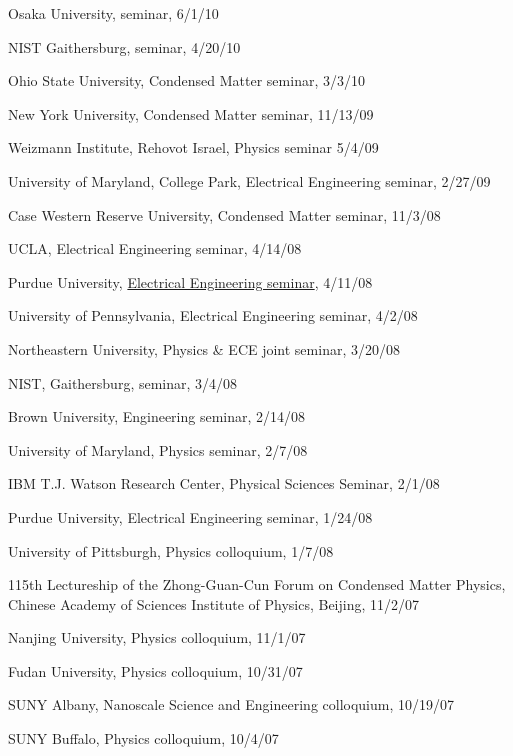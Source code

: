 \documentclass[paper=letter,fontsize=11pt]{scrartcl} %
\newcommand{\TalkEntry}[4]{
		\noindent #1, #2, #3 #4}
\begin{document}
\begin{etaremune}
\item\TalkEntry{Osaka University}{seminar}{6/1/10}{}
\item\TalkEntry{NIST Gaithersburg}{seminar}{4/20/10}{}
\item\TalkEntry{Ohio State University}{Condensed Matter seminar}{3/3/10}{}
\item\TalkEntry{New York University}{Condensed Matter seminar}{11/13/09}{}
\item\TalkEntry{Weizmann Institute}{Rehovot Israel}{Physics seminar}{5/4/09}{}
\item\TalkEntry{University of Maryland, College Park}{Electrical Engineering seminar}{2/27/09}{}
\item\TalkEntry{Case Western Reserve University}{Condensed Matter seminar}{11/3/08}{}
\item\TalkEntry{UCLA}{Electrical Engineering seminar}{4/14/08}{}
\item\TalkEntry{Purdue University}{\href{https://nanohub.org/resources/4492}{Electrical Engineering seminar}}{4/11/08 }{}
\item\TalkEntry{University of Pennsylvania}{Electrical Engineering seminar}{4/2/08 }{}
\item\TalkEntry{Northeastern University}{Physics \& ECE joint seminar}{3/20/08}{}
\item\TalkEntry{NIST, Gaithersburg}{seminar}{3/4/08}{}
\item\TalkEntry{Brown University}{Engineering seminar}{2/14/08 }{}
\item\TalkEntry{University of Maryland}{Physics seminar}{2/7/08 }{}
\item\TalkEntry{IBM T.J. Watson Research Center}{Physical Sciences Seminar}{2/1/08}{}
\item\TalkEntry{Purdue University}{Electrical Engineering seminar}{1/24/08}{}
\item\TalkEntry{University of Pittsburgh}{Physics colloquium}{1/7/08}{}
\item\TalkEntry{115th Lectureship of the Zhong-Guan-Cun Forum on Condensed Matter Physics, Chinese Academy of Sciences Institute of Physics}{Beijing}{11/2/07}{}
\item\TalkEntry{Nanjing University}{Physics colloquium}{11/1/07}{}
\item\TalkEntry{Fudan University}{Physics colloquium}{10/31/07}{}
\item\TalkEntry{SUNY Albany}{Nanoscale Science and Engineering colloquium}{10/19/07}{}
\item\TalkEntry{SUNY Buffalo}{Physics colloquium}{10/4/07}{}

\end{etaremune}
\end{document}

